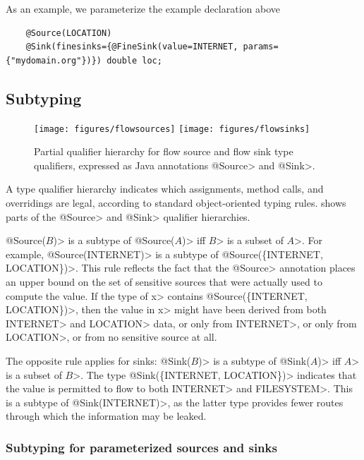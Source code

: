 As an example, we parameterize the example declaration above
\begin{Verbatim}
    @Source(LOCATION) 
    @Sink(finesinks={@FineSink(value=INTERNET, params={"mydomain.org"})}) double loc;
\end{Verbatim}

\subsection{Subtyping\label{sec:subtyping}}

\begin{figure}
\centerline{\texttt{[image: figures/flowsources]}%
  \hfill%
  \texttt{[image: figures/flowsinks]}}
\caption{Partial qualifier hierarchy for flow source and flow sink type
  qualifiers, expressed as Java annotations \<@Source> and \<@Sink>.}
\label{fig:flow-hierarchy}
\end{figure}


A type qualifier hierarchy indicates
which assignments, method calls, and overridings are legal, according to
standard object-oriented typing rules.
 shows parts of the \<@Source> and
\<@Sink> qualifier hierarchies.


\<@Source($B$)> is a subtype of \<@Source($A$)> iff \<$B$> is a subset of \<$A$>.
For example, \<@Source(INTERNET)> is a subtype of \<@Source(\{INTERNET, LOCATION\})>.
This rule reflects the fact that the \<@Source> annotation
places an upper bound on the set of sensitive sources that were actually
used to compute the value.
If the type of \<x> contains \<@Source(\{INTERNET, LOCATION\})>, then the value
in \<x> might have been derived from both \<INTERNET> and \<LOCATION> data, or
only from \<INTERNET>, or only from \<LOCATION>, or from no
sensitive source at all.

The opposite rule applies for sinks:
\<@Sink($B$)> is a subtype of \<@Sink($A$)> iff \<$A$> is a subset of \<$B$>.
The type \<@Sink(\{INTERNET, LOCATION\})> indicates that
the value is permitted to flow to both \<INTERNET> and \<FILESYSTEM>.  This
is a subtype of \<@Sink(INTERNET)>, as the latter type provides fewer routes through which the information may be
leaked.

\subsubsection{Subtyping for parameterized sources and sinks\label{sec:param-subtyping}}

